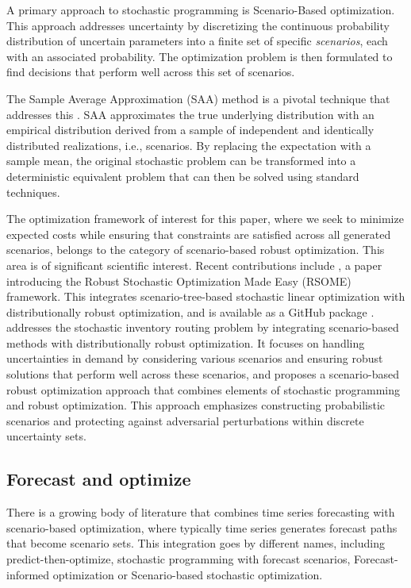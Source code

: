 \documentclass[ijoc,sglanonrev]{informs4}
\begin{document}
A primary approach to stochastic programming is Scenario-Based optimization. This approach addresses uncertainty by discretizing the continuous probability distribution of uncertain parameters into a finite set of specific {\it scenarios}, each with an associated probability. The optimization problem is then formulated to find decisions that perform well across this set of scenarios.

The Sample Average Approximation (SAA) method is a pivotal technique that addresses this \cite{SH98}. SAA approximates the true underlying distribution with an empirical distribution derived from a sample of independent and identically distributed realizations, i.e., scenarios. By replacing the expectation with a sample mean, the original stochastic problem can be transformed into a deterministic equivalent problem that can then be solved using standard techniques.

The optimization framework of interest for this paper, where we seek to minimize expected costs while ensuring that constraints are satisfied across all generated scenarios, belongs to the category of scenario-based robust optimization. This area is of significant scientific interest. Recent contributions include \cite{CSX20}, a paper introducing the Robust Stochastic Optimization Made Easy (RSOME) framework. This integrates scenario-tree-based stochastic linear optimization with distributionally robust optimization, and is available as a GitHub package \cite{CX23}. \cite{LCKZ23} addresses the stochastic inventory routing problem by integrating scenario-based methods with distributionally robust optimization. It focuses on handling uncertainties in demand by considering various scenarios and ensuring robust solutions that perform well across these scenarios, and \cite{WAJ23} proposes a scenario-based robust optimization approach that combines elements of stochastic programming and robust optimization. This approach emphasizes constructing probabilistic scenarios and protecting against adversarial perturbations within discrete uncertainty sets.

\subsection{Forecast and optimize}

There is a growing body of literature that combines time series forecasting with scenario-based optimization, where typically time series generates forecast paths that become scenario sets.
This integration goes by different names, including predict-then-optimize, stochastic programming with forecast scenarios, Forecast-informed optimization or Scenario-based stochastic optimization.
\end{document}
